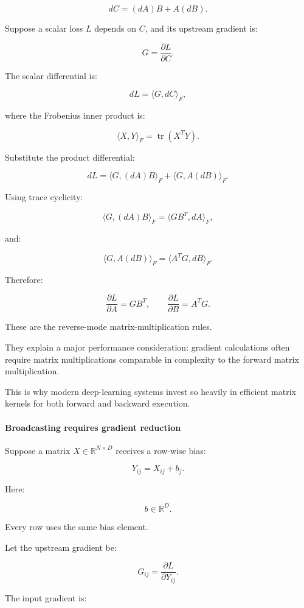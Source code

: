 \[
\boxed{ dC=(dA)B+A(dB) }.
\]

Suppose a scalar loss \(L\) depends on \(C\), and its upstream gradient is:

\[
G=\frac{\partial L}{\partial C}.
\]

The scalar differential is:

\[
dL=\langle G,dC\rangle_F,
\]

where the Frobenius inner product is:

\[
\langle X,Y\rangle_F =\operatorname{tr}(X^TY).
\]

Substitute the product differential:

\[
dL=\langle G,(dA)B\rangle_F+ \langle G,A(dB)\rangle_F.
\]

Using trace cyclicity:

\[
\langle G,(dA)B\rangle_F =\langle GB^T,dA\rangle_F,
\]

and:

\[
\langle G,A(dB)\rangle_F =\langle A^TG,dB\rangle_F.
\]

Therefore:

\[
\boxed{ \frac{\partial L}{\partial A}=GB^T, \qquad \frac{\partial L}{\partial B}=A^TG }.
\]

These are the reverse-mode matrix-multiplication rules.

They explain a major performance consideration: gradient calculations often require matrix multiplications comparable in complexity to the forward matrix multiplication.

This is why modern deep-learning systems invest so heavily in efficient matrix kernels for both forward and backward execution.

\paragraph{Broadcasting requires gradient reduction}\label{broadcasting-requires-gradient-reduction}

Suppose a matrix \(X\in\mathbb R^{N\times D}\) receives a row-wise bias:

\[
Y_{ij}=X_{ij}+b_j.
\]

Here:

\[
b\in\mathbb R^D.
\]

Every row uses the same bias element.

Let the upstream gradient be:

\[
G_{ij}=\frac{\partial L}{\partial Y_{ij}}.
\]

The input gradient is:

